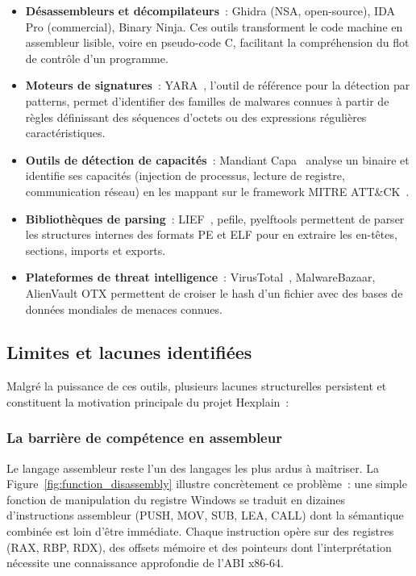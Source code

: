 \begin{itemize}
  \item \textbf{Désassembleurs et décompilateurs}~: Ghidra (NSA, open-source), IDA Pro (commercial), Binary Ninja. Ces outils transforment le code machine en assembleur lisible, voire en pseudo-code C, facilitant la compréhension du flot de contrôle d'un programme.
  \item \textbf{Moteurs de signatures}~: YARA~\cite{yara2023}, l'outil de référence pour la détection par patterns, permet d'identifier des familles de malwares connues à partir de règles définissant des séquences d'octets ou des expressions régulières caractéristiques.
  \item \textbf{Outils de détection de capacités}~: Mandiant Capa~\cite{capa2020} analyse un binaire et identifie ses capacités (injection de processus, lecture de registre, communication réseau) en les mappant sur le framework MITRE ATT\&CK~\cite{mitre_attck}.
  \item \textbf{Bibliothèques de parsing}~: LIEF~\cite{lief2017}, pefile, pyelftools permettent de parser les structures internes des formats PE et ELF pour en extraire les en-têtes, sections, imports et exports.
  \item \textbf{Plateformes de threat intelligence}~: VirusTotal~\cite{virustotal}, MalwareBazaar, AlienVault OTX permettent de croiser le hash d'un fichier avec des bases de données mondiales de menaces connues.
\end{itemize}

\subsection{Limites et lacunes identifiées}

Malgré la puissance de ces outils, plusieurs lacunes structurelles persistent et constituent la motivation principale du projet Hexplain~:

\subsubsection{La barrière de compétence en assembleur}

Le langage assembleur reste l'un des langages les plus ardus à maîtriser. La Figure~\ref{fig:function_disassembly} illustre concrètement ce problème~: une simple fonction de manipulation du registre Windows se traduit en dizaines d'instructions assembleur (PUSH, MOV, SUB, LEA, CALL) dont la sémantique combinée est loin d'être immédiate. Chaque instruction opère sur des registres (RAX, RBP, RDX), des offsets mémoire et des pointeurs dont l'interprétation nécessite une connaissance approfondie de l'ABI x86-64.

